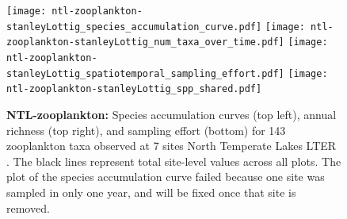 \documentclass[11pt, oneside]{article}
\begin{document}
\begin{figure}[h!]
\centering
\texttt{[image: ntl-zooplankton-stanleyLottig\_species\_accumulation\_curve.pdf]}
\texttt{[image: ntl-zooplankton-stanleyLottig\_num\_taxa\_over\_time.pdf]}
\texttt{[image: ntl-zooplankton-stanleyLottig\_spatiotemporal\_sampling\_effort.pdf]}
\texttt{[image: ntl-zooplankton-stanleyLottig\_spp\_shared.pdf]}
\caption{{\bf NTL-zooplankton:} Species accumulation curves (top left),  annual richness (top right), and sampling effort (bottom)  for 143 zooplankton taxa observed at 7 sites North Temperate Lakes LTER . The black lines represent total site-level values across all plots. The plot of the species accumulation curve failed because one site was sampled in only one year, and will be fixed once that site is removed.}
\label{ntl-zooplankton}
\end{figure}


\end{document}
